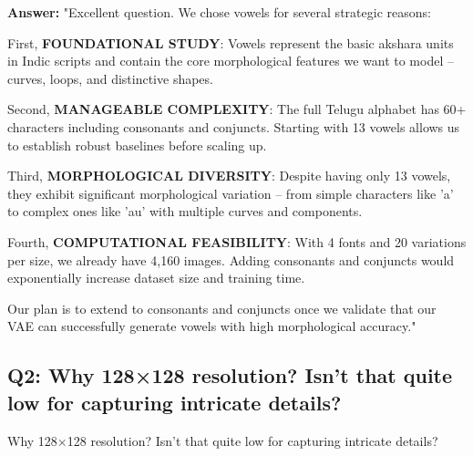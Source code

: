 \documentclass[11pt,a4paper]{article}
\begin{document}
\begin{answerbox}
\textbf{Answer:} "Excellent question. We chose vowels for several strategic reasons:

First, \textbf{FOUNDATIONAL STUDY}: Vowels represent the basic akshara units in Indic scripts and contain the core morphological features we want to model -- curves, loops, and distinctive shapes.

Second, \textbf{MANAGEABLE COMPLEXITY}: The full Telugu alphabet has 60+ characters including consonants and conjuncts. Starting with 13 vowels allows us to establish robust baselines before scaling up.

Third, \textbf{MORPHOLOGICAL DIVERSITY}: Despite having only 13 vowels, they exhibit significant morphological variation -- from simple characters like 'a' to complex ones like 'au' with multiple curves and components.

Fourth, \textbf{COMPUTATIONAL FEASIBILITY}: With 4 fonts and 20 variations per size, we already have 4,160 images. Adding consonants and conjuncts would exponentially increase dataset size and training time.

Our plan is to extend to consonants and conjuncts once we validate that our VAE can successfully generate vowels with high morphological accuracy."
\end{answerbox}

\subsection{Q2: Why 128×128 resolution? Isn't that quite low for capturing intricate details?}

\begin{qbox}[title=Question]
Why 128×128 resolution? Isn't that quite low for capturing intricate details?
\end{qbox}
\end{document}
